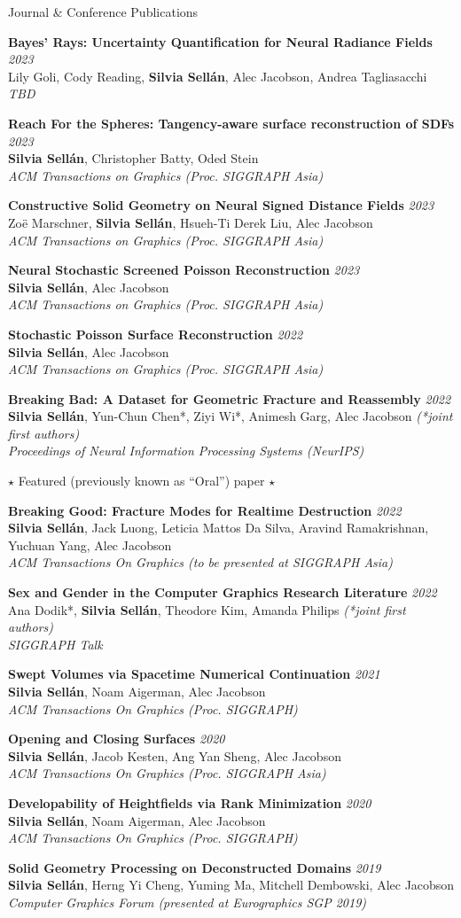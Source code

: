 \documentclass{resume}
\newcommand{\publication}[5]{
    {\bf #1} \hfill {\em \small #2} \\ %
    {\small#3}{\small \bf Silvia Sell\'{a}n}{\small #4} \\ %
    {\small \it #5} %
}
\begin{document}
\begin{rSection}{Journal \& Conference Publications}

\publication{Bayes' Rays: Uncertainty Quantification for Neural Radiance Fields}{2023}{Lily Goli, Cody Reading, }{, Alec Jacobson, Andrea Tagliasacchi}{TBD}

\publication{Reach For the Spheres: Tangency-aware surface reconstruction of SDFs}{2023}{}{, Christopher Batty, Oded Stein}{ACM Transactions on Graphics (Proc. SIGGRAPH Asia)}

\publication{Constructive Solid Geometry on Neural Signed Distance Fields}{2023}{Zo\"{e} Marschner, }{, Hsueh-Ti Derek Liu, Alec Jacobson}{ACM Transactions on Graphics (Proc. SIGGRAPH Asia)}

\publication{Neural Stochastic Screened Poisson Reconstruction}{2023}{}{, Alec Jacobson}{ACM Transactions on Graphics (Proc. SIGGRAPH Asia)}

\publication{Stochastic Poisson Surface Reconstruction}{2022}{}{, Alec Jacobson}{ACM Transactions on Graphics (Proc. SIGGRAPH Asia)}

\publication{Breaking Bad: A Dataset for Geometric Fracture and Reassembly}{2022}{}{*, Yun-Chun Chen*, Ziyi Wi*, Animesh Garg, Alec Jacobson  \textit{(*joint first authors)}}{Proceedings of Neural Information Processing Systems (NeurIPS)}
\newline \small{$\star$ Featured (previously known as ``Oral'') paper $\star$}

\publication{Breaking Good: Fracture Modes for Realtime Destruction}{2022}{}{, Jack Luong, Leticia Mattos Da Silva, Aravind Ramakrishnan, Yuchuan Yang, Alec Jacobson}{ACM Transactions On Graphics (to be presented at SIGGRAPH Asia)}

\publication{Sex and Gender in the Computer Graphics Research Literature}{2022}{Ana Dodik*, }{*, Theodore Kim, Amanda Philips \textit{(*joint first authors)}}{SIGGRAPH Talk}

\publication{Swept Volumes via Spacetime Numerical Continuation}{2021}{}{, Noam Aigerman, Alec Jacobson}{ACM Transactions On Graphics (Proc. SIGGRAPH)}

\publication{Opening and Closing Surfaces}{2020}{}{, Jacob Kesten, Ang Yan Sheng, Alec Jacobson}{ACM Transactions On Graphics (Proc. SIGGRAPH Asia)}

\publication{Developability of Heightfields via Rank Minimization}{2020}{}{, Noam Aigerman, Alec Jacobson}{ACM Transactions On Graphics (Proc. SIGGRAPH)}

\publication{Solid Geometry Processing on Deconstructed Domains}{2019}{}{, Herng Yi Cheng, Yuming Ma, Mitchell Dembowski, Alec Jacobson}{Computer Graphics Forum (presented at Eurographics SGP 2019)}
\end{rSection}
\end{document}
